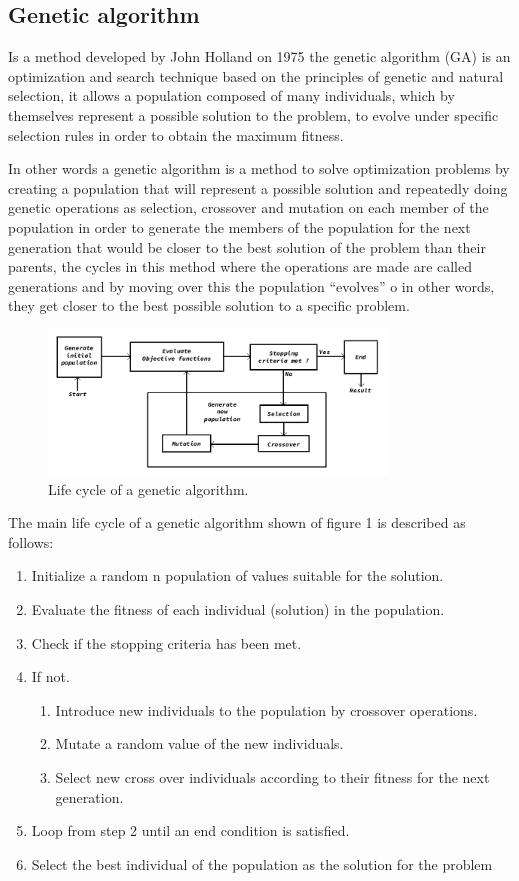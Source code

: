 \documentclass[conference]{IEEEtran}
\begin{document}
\subsection{Genetic algorithm}
Is a method developed by John Holland on 1975 \cite{Holland1975} the genetic
algorithm (GA) is an optimization and search technique based on the principles
of genetic and natural selection, it allows a population composed of many
individuals, which by themselves represent a possible solution to the problem,
to evolve under specific selection rules in order to obtain the maximum fitness.

In other words a genetic algorithm is a method to solve optimization problems by
creating a population that will represent a possible solution and repeatedly
doing genetic operations as selection, crossover and mutation on each member of
the population in order to generate the members of the population for the next
generation that would be closer to the best solution of the problem than their
parents, the cycles in this method where the operations are made are called
generations and by moving over this the population “evolves” o in other words,
they get closer to the best possible solution  to a specific problem.

\begin{figure}[htbp]
\centerline{\includegraphics[width=90mm]{Images/ga_life_cycle.png}}
\caption{Life cycle of a genetic algorithm.}
\label{fig}
\end{figure}

The main life cycle of a genetic algorithm shown of figure 1 is described as
follows:
\begin{enumerate}
    \item Initialize a random n population of values suitable for the solution.
    \item Evaluate the fitness of each individual (solution) in the population.
    \item Check if the stopping criteria has been met.
    \item If not.
    \begin{enumerate}
        \item Introduce new individuals to the population by crossover
        operations.
        \item Mutate a random value of the new individuals.
        \item Select new cross over individuals according to their fitness for
        the next generation.
    \end{enumerate}
    \item Loop from step 2 until an end condition is satisfied.
    \item Select the best individual of the population as the solution for the
    problem
\end{enumerate}
\end{document}
